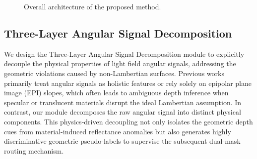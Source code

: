 \documentclass[lettersize,journal]{IEEEtran}
\begin{document}
\begin{figure}[!t]
{
}
\caption{Overall architecture of the proposed method.}
\label{fig:architecture}
\end{figure}

\subsection{Three-Layer Angular Signal Decomposition}

We design the Three-Layer Angular Signal Decomposition module to explicitly decouple the physical properties of light field angular signals, addressing the geometric violations caused by non-Lambertian surfaces. Previous works \cite{previous_works} primarily treat angular signals as holistic features or rely solely on epipolar plane image (EPI) slopes, which often leads to ambiguous depth inference when specular or translucent materials disrupt the ideal Lambertian assumption. In contrast, our module decomposes the raw angular signal into distinct physical components. This physics-driven decoupling not only isolates the geometric depth cues from material-induced reflectance anomalies but also generates highly discriminative geometric pseudo-labels to supervise the subsequent dual-mask routing mechanism.
\end{document}
